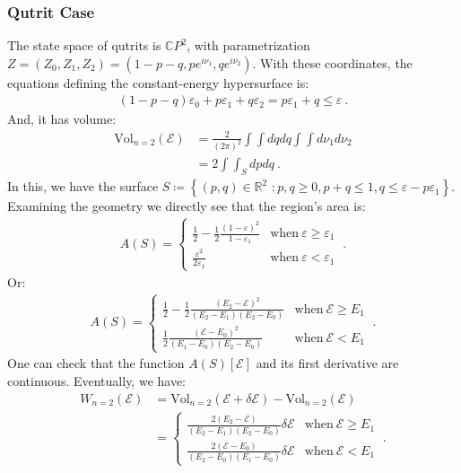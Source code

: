 \documentclass[draft,nofootinbib,pre,twocolumn,showpacs,showkeys,groupaddress,preprintnumbers,floatfix]{revtex4-1}
\newcommand{\1}{\mathbbm{1}}
\begin{document}
\subsubsection{Qutrit Case}

The state space of qutrits is $\mathbb{C}P^2$, with parametrization $Z =
(Z_0,Z_1,Z_2) = (1-p-q,p e^{i\nu_1},q e^{i\nu_2})$. With these coordinates, the
equations defining the constant-energy hypersurface is:
\begin{align*}
(1-p-q) \varepsilon_0 + p \varepsilon_1 + q \varepsilon_2
  = p \varepsilon_1 + q \leq \varepsilon
  ~.
\end{align*}
And, it has volume:
\begin{align*}
\mathrm{Vol}_{n=2}(\mathcal{E})
  & = \frac{2}{(2\pi)^2} \int \!\!\! \int dq dq \int \!\!\! \int d\nu_1 d\nu_2 \\
  & = 2 \int \!\! \! \int_S dp dq
  ~.
\end{align*}
In this, we have the surface $S \coloneqq \left\{ (p,q) \in \mathbb{R}^2 \,\,:
p,q \geq 0 , p+q \leq 1, q \leq \varepsilon - p \varepsilon_1\right\}$.
Examining the geometry we directly see that the region's area is:
\begin{align*}
A(S) =
  \begin{cases}
  \frac{1}{2} - \frac{1}{2} \frac{(1-\varepsilon)^2}{1-\varepsilon_1}
  & \mathrm{when~} \varepsilon \geq \varepsilon_1 \\
  \frac{\varepsilon^2}{2\varepsilon_1}
  & \mathrm{when~} \varepsilon < \varepsilon_1
  \end{cases}
 ~.
\end{align*}
Or:
\begin{align*}
A(S) =
  \begin{cases}
  \frac{1}{2} - \frac{1}{2} \frac{(E_2 - \mathcal{E})^2}{(E_2-E_1)(E_2-E_0)}
  & \mathrm{when ~} \mathcal{E} \geq E_1 \\
  \frac{1}{2}\frac{(\mathcal{E}-E_0)^2}{(E_1-E_0)(E_2-E_0)}
  & \mathrm{when~} \mathcal{E} < E_1
  \end{cases}
  ~.
\end{align*}
One can check that the function $A(S)[\mathcal{E}]$ and its first derivative
are continuous. Eventually, we have:
\begin{align*}
W_{n=2}(\mathcal{E})
  & = \mathrm{Vol}_{n=2}(\mathcal{E}+\delta \mathcal{E})
  - \mathrm{Vol}_{n=2}(\mathcal{E}) \\
  & = \begin{cases}
  \frac{2(E_2 - \mathcal{E})}{(E_2-E_1)(E_2-E_0)} \delta \mathcal{E}
  & \mathrm{when~} \mathcal{E} \geq E_1 \\
  \frac{2(\mathcal{E} - E_0)}{(E_2-E_0)(E_1-E_0)} \delta \mathcal{E}
  & \mathrm{when~} \mathcal{E} < E_1
  \end{cases}
  ~.
\end{align*}
\end{document}

